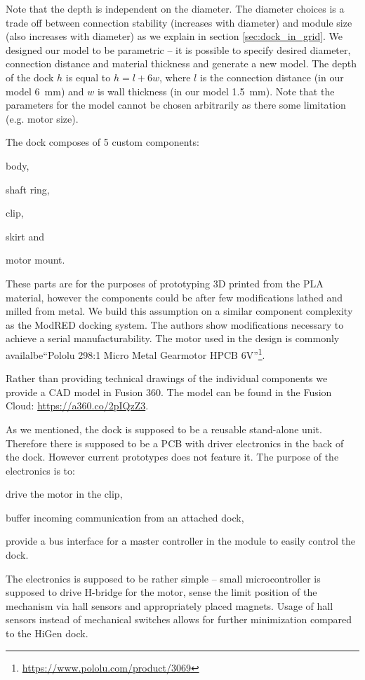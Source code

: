 Note that the depth is independent on the diameter. The diameter choices is a
trade off between connection stability (increases with diameter) and module size
(also increases with diameter) as we explain in section \ref{sec:dock_in_grid}.
We designed our model to be parametric -- it is possible to specify desired
diameter, connection distance and material thickness and generate a new model.
The depth of the dock $h$ is equal to $h=l+6w$, where $l$ is the connection
distance (in our model 6~mm) and $w$ is wall thickness (in our model 1.5~mm).
Note that the parameters for the model cannot be chosen arbitrarily as there
some limitation (e.g. motor size).

The dock composes of 5 custom components:
\begin{enumerate*}
    \item body,
    \item shaft ring,
    \item clip,
    \item skirt and
    \item motor mount.
\end{enumerate*}
These parts are for the purposes of prototyping 3D printed from the PLA
material, however the components could be after few modifications lathed and
milled from metal. We build this assumption on a similar component complexity as
the ModRED docking system\cite{hossain_towards_2014}. The authors show
modifications necessary to achieve a serial manufacturability. The motor used in
the design is commonly availalbe``Pololu 298:1 Micro Metal Gearmotor HPCB
6V''\footnote{\url{https://www.pololu.com/product/3069}}.

Rather than providing technical drawings of the individual components we provide
a CAD model in Fusion 360. The model can be found in the Fusion Cloud:
\url{https://a360.co/2pIQzZ3}.

As we mentioned, the dock is supposed to be a reusable stand-alone unit.
Therefore there is supposed to be a PCB with driver electronics in the back of
the dock. However current prototypes does not feature it. The purpose of the
electronics is to:
\begin{enumerate*}
    \item drive the motor in the clip,
    \item buffer incoming communication from an attached dock,
    \item provide a bus interface for a master controller in the module to
    easily control the dock.
\end{enumerate*}
The electronics is supposed to be rather simple -- small microcontroller is
supposed to drive H-bridge for the motor, sense the limit position of the
mechanism via hall sensors and appropriately placed magnets. Usage of hall
sensors instead of mechanical switches allows for further minimization compared
to the HiGen dock.

